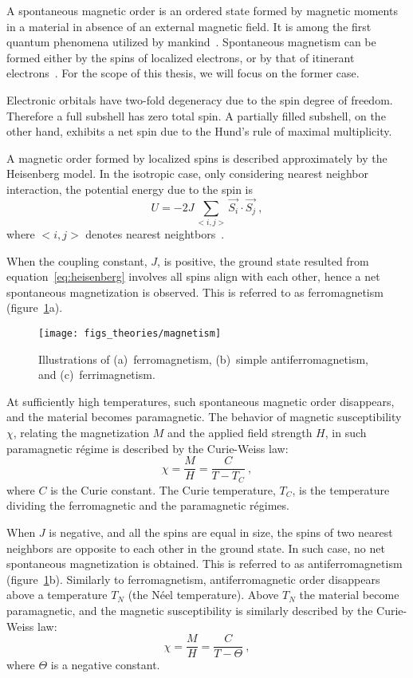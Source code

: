 A spontaneous magnetic order is an ordered state formed by magnetic moments in a material in absence of an external magnetic field. It is among the first quantum phenomena utilized by mankind~\cite{mag_history}. Spontaneous magnetism can be formed either by the spins of localized electrons, or by that of itinerant electrons~\cite{moriya1984}. For the scope of this thesis, we will focus on the former case.

Electronic orbitals have two-fold degeneracy due to the spin degree of freedom. Therefore a full subshell has zero total spin. A partially filled subshell, on the other hand, exhibits a net spin due to the Hund's rule of maximal multiplicity.

A magnetic order formed by localized spins is described approximately by the Heisenberg model. In the isotropic case, only considering nearest neighbor interaction, the potential energy due to the spin is%
\begin{equation}%
    U = -2J \sum_{<i, j>} \vec{S_i} \cdot \vec{S_j}~,\label{eq:heisenberg}%
\end{equation}%
where $<i, j>$ denotes nearest neightbors~\cite{kittel}.

When the coupling constant, $J$, is positive, the ground state resulted from equation~\ref{eq:heisenberg} involves all spins align with each other, hence a net spontaneous magnetization is observed. This is referred to as ferromagnetism (figure~\ref{fig:bg_mag}a). %
\begin{figure}[ht]%
    \centering%
    \texttt{[image: figs\_theories/magnetism]}%
    \caption[Illustrations of ferromagnetism, antiferromagnetism, and ferrimagnetism]{\label{fig:bg_mag}Illustrations of (a)~ferromagnetism, (b)~simple antiferromagnetism, and (c)~ferrimagnetism.}%
\end{figure}%
%
At sufficiently high temperatures, such spontaneous magnetic order disappears, and the material becomes paramagnetic. The behavior of magnetic susceptibility $\chi$, relating the magnetization $M$ and the applied field strength $H$, in such paramagnetic r\'egime is described by the Curie-Weiss law:%
\begin{equation}%
    \chi = \frac{M}{H} = \frac{C}{T - T_C}~,\label{eq:curie_weiss}%
\end{equation}%
where $C$ is the Curie constant. The Curie temperature, $T_C$, is the temperature dividing the ferromagnetic and the paramagnetic r\'egimes.

When $J$ is negative, and all the spins are equal in size, the spins of two nearest neighbors are opposite to each other in the ground state. In such case, no net spontaneous magnetization is obtained. This is referred to as antiferromagnetism (figure~\ref{fig:bg_mag}b). Similarly to ferromagnetism, antiferromagnetic order disappears above a temperature $T_N$ (the N\'eel temperature). Above $T_N$ the material become paramagnetic, and the magnetic susceptibility is similarly described by the Curie-Weiss law:%
\begin{equation}%
    \chi = \frac{M}{H} = \frac{C}{T - \Theta}~,%
\end{equation}%
where $\Theta$ is a negative constant.


